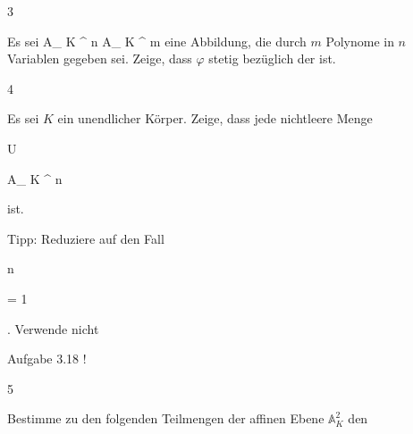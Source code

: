 {} {}






{3}


{


Es sei
\maabbdisp {\varphi} { { {\mathbb A}_{  K }^{  n   } }  } { { {\mathbb A}_{  K }^{  m   } }
} {}
eine Abbildung, die durch $m$ Polynome in $n$ Variablen gegeben sei. Zeige, dass $\varphi$ stetig bezüglich der
ist.


}


{} {}




{4}


{


Es sei $K$ ein unendlicher Körper. Zeige, dass jede nichtleere
Menge


\mavergleichskette


{\vergleichskette


{ U
}


{ \subseteq }{ { {\mathbb A}_{  K }^{  n   } }
}


{  }{
}


{    }{
}


{   }{
}


}
{}{}{}
ist.


}


{} {Tipp: Reduziere auf den Fall


\mavergleichskette


{\vergleichskette


{ n
}


{ = }{ 1
}


{  }{
}


{    }{
}


{   }{
}


}
{}{}{.}
Verwende nicht

Aufgabe 3.18
!}




{5}


{


Bestimme zu den folgenden Teilmengen der affinen Ebene $\mathbb A^2_K$ den


}


